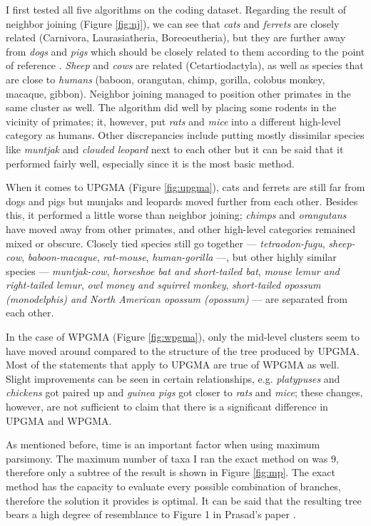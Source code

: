 \documentclass[11pt,twocolumn]{article}
\begin{document}
I first tested all five algorithms on the coding dataset. Regarding the result of neighbor joining (Figure \ref{fig:nj}), we can see that \textit{cats} and \textit{ferrets} are closely related (Carnivora, Laurasiatheria, Boreoeutheria), but they are further away from \textit{dogs} and \textit{pigs} which should be closely related to them according to the point of reference \cite{Prasad2008}. \textit{Sheep} and \textit{cows} are related (Cetartiodactyla), as well as species that are close to \textit{humans} (baboon, orangutan, chimp, gorilla, colobus monkey, macaque, gibbon). Neighbor joining managed to position other primates in the same cluster as well. The algorithm did well by placing some rodents in the vicinity of primates; it, however, put \textit{rats} and \textit{mice} into a different high-level category as humans. Other discrepancies include putting mostly dissimilar species like \textit{muntjak} and \textit{clouded leopard} next to each other but it can be said that it performed fairly well, especially since it is the most basic method.

When it comes to UPGMA (Figure \ref{fig:upgma}), cats and ferrets are still far from dogs and pigs but munjaks and leopards moved further from each other. Besides this, it performed a little worse than neighbor joining; \textit{chimps} and \textit{orangutans} have moved away from other primates, and other high-level categories remained mixed or obscure. Closely tied species still go together — \textit{tetraodon-fugu}, \textit{sheep-cow}, \textit{baboon-macaque}, \textit{rat-mouse}, \textit{human-gorilla} —, but other highly similar species — \textit{muntjak-cow}, \textit{horseshoe bat and short-tailed bat}, \textit{mouse lemur and right-tailed lemur}, \textit{owl money and squirrel monkey}, \textit{short-tailed opossum (monodelphis) and North American opossum (opossum)} — are separated from each other.

In the case of WPGMA (Figure \ref{fig:wpgma}), only the mid-level clusters seem to have moved around compared to the structure of the tree produced by UPGMA. Most of the statements that apply to UPGMA are true of WPGMA as well. Slight improvements can be seen in certain relationships, e.g. \textit{platypuses} and \textit{chickens} got paired up and \textit{guinea pigs} got closer to \textit{rats} and \textit{mice}; these changes, however, are not sufficient to claim that there is a significant difference in UPGMA and WPGMA.

As mentioned before, time is an important factor when using maximum parsimony. The maximum number of taxa I ran the exact method on was 9, therefore only a subtree of the result is shown in Figure \ref{fig:mp}. The exact method has the capacity to evaluate every possible combination of branches, therefore the solution it provides is optimal. It can be said that the resulting tree bears a high degree of resemblance to Figure 1 in Prasad's paper \cite{Prasad2008}.
\end{document}
